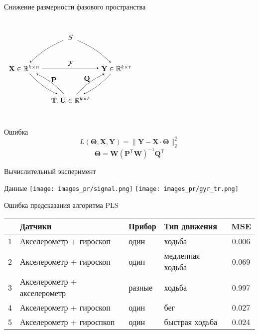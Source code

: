 \documentclass[9pt]{beamer}
\newcommand{\bP}{\mathbf{P}}
\newcommand{\bQ}{\mathbf{Q}}
\newcommand{\bbR}{\mathbb{R}}
\begin{document}
\begin{frame}{Снижение размерности фазового пространства}
\begin{columns}
\[
        \begin{tikzpicture}
			\matrix (m) [matrix of math nodes,row sep=3em,column sep=1em,minimum width=2em,ampersand replacement=\&]
			{
			    \& S \&
			    \\
				\mathbf{X}\in\bbR^{k\times n} \& \& \mathbf{Y}\in\bbR^{k\times r} \\
				\& \mathbf{T}, \mathbf{U} \in \bbR^{k\times\ell} \& \\};
			\path[-stealth]
			(m-1-2) edge [bend right=10] node {} (m-2-1)
			(m-1-2) edge [bend left=10] node {} (m-2-3)
			(m-2-1) edge node [above] {$\mathcal{F}$} (m-2-3)
			(m-2-1) edge [bend right=10] node [below, pos=0.4] {} (m-3-2)
			(m-3-2) edge [bend right=10] node [above, pos=0.4] {$\bP$} (m-2-1)
			(m-2-3) edge [bend left=10] node [below, pos=0.4] {} (m-3-2)
			(m-3-2) edge [bend left=10] node [above, pos=0.4] {$\bQ$} (m-2-3);
		\end{tikzpicture}
    \]
\end{columns}
\vspace{-0.5cm}
\begin{block}{Ошибка}
	\vspace{-0.2cm}
\[
    L(\mathbf{\Theta}, \mathbf{X}, \mathbf{Y}) = \|\mathbf{Y} - \mathbf{X}\cdot\mathbf{\Theta}\|_2^2
\]
\vspace{-0.2cm}
\[
    \mathbf{\Theta} = \mathbf{W}(\mathbf{P}^{\mathsf{T}}\mathbf{W})^{-1}\mathbf{Q}^{\mathsf{T}}
\]
\end{block}
\end{frame}
\begin{frame}{Вычислительный эксперимент}
\begin{block}{Данные}
\vspace{0.3cm}
\hfil\texttt{[image: images\_pr/signal.png]}
\hfil\texttt{[image: images\_pr/gyr\_tr.png]}
\end{block}
\begin{block}{Ошибка предсказания алгоритма PLS}
\vspace{-0.3cm}
\begin{table}[bhtp]
	\centering
	\label{tbl:methods}
	\begin{tabular}{l|l|l|l|c}
		\hline
		& Датчики & Прибор & Тип движения & MSE \\
		\hline
	1 & Акселерометр + гироскоп & один & ходьба & 0.006 \\
	2 & Акселерометр + гироскоп & один & медленная ходьба & 0.069  \\
	3 &	Акселерометр + акселерометр & разные & ходьба & 0.997  \\
	4 &	Акселерометр + гироскоп & один & бег & 0.027  \\
	5 &	Акселерометр + гироспкоп & один & быстрая ходьба & 0.024  \\

		\hline   
	\end{tabular}
\end{table}
\end{block}

\end{frame}
\end{document}
